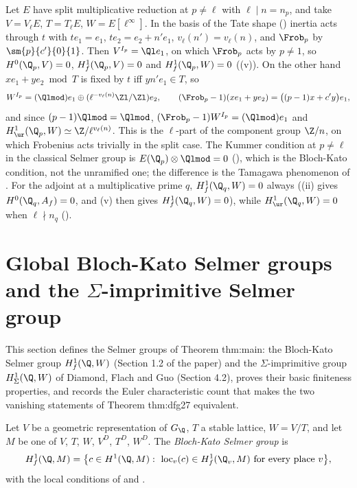 \begin{example}\label{ex:blochkato:ur-versus-f}
Let $E$ have split multiplicative reduction at $p\ne\ell$ with $\ell\mid n=n_p$, and take $V=V_\ell E$, $T=T_\ell E$, $W=E[\ell^\infty]$. In the basis of the Tate shape
() inertia acts through $t$ with $te_1=e_1$, $te_2=e_2+n'e_1$, $v_\ell(n')=v_\ell(n)$, and $\Frob_p$ by $\sm{p}{c'}{0}{1}$. Then $V^{I_p}=\Ql e_1$, on which $\Frob_p$ acts by
$p\ne1$, so $H^0(\Q_p,V)=0$, $H^1_f(\Q_p,V)=0$ and $H^1_f(\Q_p,W)=0$ ((v)). On the other hand $x e_1+ye_2\bmod T$ is fixed by $t$ iff
$yn'e_1\in T$, so
\[
W^{I_p}=(\Qlmod)e_1\oplus(\ell^{-v_\ell(n)}\Zl/\Zl)e_2,\qquad(\Frob_p-1)(xe_1+ye_2)=\bigl((p-1)x+c'y\bigr)e_1,
\]
and since $(p-1)\Qlmod=\Qlmod$, $(\Frob_p-1)W^{I_p}=(\Qlmod)e_1$ and $H^1_{\ur}(\Q_p,W)\simeq\Z/\ell^{v_\ell(n)}$. This is the $\ell$-part of the component group $\Z/n$, on which
Frobenius acts trivially in the split case. The Kummer condition at $p\ne\ell$ in the classical Selmer group is $E(\Q_p)\otimes\Qlmod=0$ (),
which is the Bloch-Kato condition, not the unramified one; the difference is the Tamagawa phenomenon of . For the adjoint at a
multiplicative prime $q$, $H^1_f(\Q_q,W)=0$ always ((ii) gives $H^0(\Q_q,A_f)=0$, and (v) then
gives $H^1_f(\Q_q,W)=0$), while $H^1_{\ur}(\Q_q,W)=0$ when $\ell\nmid n_q$ ().
\end{example}

\section[Global Selmer groups]{Global Bloch-Kato Selmer groups and the \texorpdfstring{$\Sigma$}{Sigma}-imprimitive Selmer group}\label{sec:blochkato:selmer}

This section defines the Selmer groups of Theorem thm:main: the Bloch-Kato Selmer group $H^1_f(\Q,W)$ (Section 1.2 of the paper) and the
$\Sigma$-imprimitive group $H^1_\Sigma(\Q,W)$ of Diamond, Flach and Guo (Section 4.2), proves their basic finiteness properties, and records the Euler
characteristic count that makes the two vanishing statements of Theorem thm:dfg27 equivalent.

\begin{definition}\label{def:blochkato:selmer}
Let $V$ be a geometric representation of $G_\Q$, $T$ a stable lattice, $W=V/T$, and let $M$ be one of $V$, $T$, $W$, $V^D$, $T^D$, $W^D$. The \emph{Bloch-Kato Selmer group}
is
\[
H^1_f(\Q,M)=\bigl\{c\in H^1(\Q,M):\ \operatorname{loc}_v(c)\in H^1_f(\Q_v,M)\text{ for every place }v\bigr\},
\]
with the local conditions of  and .
\end{definition}

